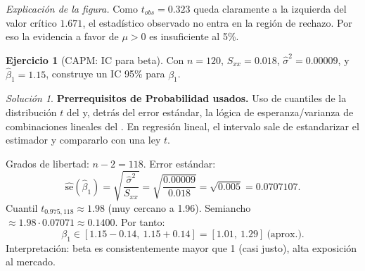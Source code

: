 \documentclass[11pt]{article}
\theoremstyle{plain}
\theoremstyle{definition}
\newtheorem{exercise}[theorem]{Ejercicio}
\theoremstyle{remark}
\theoremstyle{solstyle}
\newtheorem*{solution}{Solución}
\newcommand{\1}{\mathbbm{1}}
\begin{document}
\begin{center}
\end{center}

\noindent\textit{Explicación de la figura.} Como $t_{obs}=0.323$ queda claramente a la izquierda del valor crítico $1.671$, el estadístico observado no entra en la región de rechazo. Por eso la evidencia a favor de $\mu>0$ es insuficiente al 5\%.

\begin{exercise}[CAPM: IC para beta]\label{ex:ex4}
Con $n=120$, $S_{xx}=0.018$, $\widehat\sigma^2=0.00009$, y $\widehat\beta_1=1.15$,
construye un IC 95\% para $\beta_1$.
\end{exercise}

\begin{solution}
\textbf{Prerrequisitos de Probabilidad usados.}
Uso de cuantiles de la distribución $t$ del  y, detrás del error estándar,
la lógica de esperanza/varianza de combinaciones lineales del .
En regresión lineal, el intervalo sale de estandarizar el estimador y compararlo con una ley $t$.

Grados de libertad: $n-2=118$.
Error estándar:
\[
\widehat{\mathrm{se}}(\widehat\beta_1)=\sqrt{\frac{\widehat\sigma^2}{S_{xx}}}
=\sqrt{\frac{0.00009}{0.018}}=\sqrt{0.005}=0.0707107.
\]
Cuantil $t_{0.975,118}\approx 1.98$ (muy cercano a 1.96).
Semiancho $\approx 1.98\cdot 0.07071\approx 0.1400$.
Por tanto:
\[
\beta_1\in[1.15-0.14,\ 1.15+0.14]=[1.01,\ 1.29]\ \text{(aprox.)}.
\]
Interpretación: beta es consistentemente mayor que 1 (casi justo), alta exposición al mercado.
\end{solution}
\end{document}
